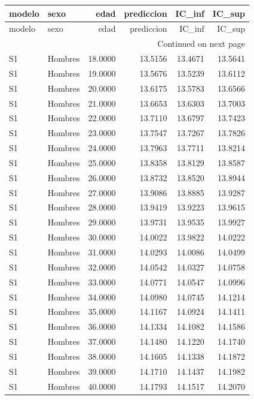 \begin{longtable}{llrrrr}
\toprule
modelo & sexo & edad & prediccion & IC\_inf & IC\_sup \\
\midrule
\endfirsthead
\toprule
modelo & sexo & edad & prediccion & IC\_inf & IC\_sup \\
\midrule
\endhead
\midrule
\multicolumn{6}{r}{Continued on next page} \\
\midrule
\endfoot
\bottomrule
\endlastfoot
S1 & Hombres & 18.0000 & 13.5156 & 13.4671 & 13.5641 \\
S1 & Hombres & 19.0000 & 13.5676 & 13.5239 & 13.6112 \\
S1 & Hombres & 20.0000 & 13.6175 & 13.5783 & 13.6566 \\
S1 & Hombres & 21.0000 & 13.6653 & 13.6303 & 13.7003 \\
S1 & Hombres & 22.0000 & 13.7110 & 13.6797 & 13.7423 \\
S1 & Hombres & 23.0000 & 13.7547 & 13.7267 & 13.7826 \\
S1 & Hombres & 24.0000 & 13.7963 & 13.7711 & 13.8214 \\
S1 & Hombres & 25.0000 & 13.8358 & 13.8129 & 13.8587 \\
S1 & Hombres & 26.0000 & 13.8732 & 13.8520 & 13.8944 \\
S1 & Hombres & 27.0000 & 13.9086 & 13.8885 & 13.9287 \\
S1 & Hombres & 28.0000 & 13.9419 & 13.9223 & 13.9615 \\
S1 & Hombres & 29.0000 & 13.9731 & 13.9535 & 13.9927 \\
S1 & Hombres & 30.0000 & 14.0022 & 13.9822 & 14.0222 \\
S1 & Hombres & 31.0000 & 14.0293 & 14.0086 & 14.0499 \\
S1 & Hombres & 32.0000 & 14.0542 & 14.0327 & 14.0758 \\
S1 & Hombres & 33.0000 & 14.0771 & 14.0547 & 14.0996 \\
S1 & Hombres & 34.0000 & 14.0980 & 14.0745 & 14.1214 \\
S1 & Hombres & 35.0000 & 14.1167 & 14.0924 & 14.1411 \\
S1 & Hombres & 36.0000 & 14.1334 & 14.1082 & 14.1586 \\
S1 & Hombres & 37.0000 & 14.1480 & 14.1220 & 14.1740 \\
S1 & Hombres & 38.0000 & 14.1605 & 14.1338 & 14.1872 \\
S1 & Hombres & 39.0000 & 14.1710 & 14.1437 & 14.1982 \\
S1 & Hombres & 40.0000 & 14.1793 & 14.1517 & 14.2070 \\

\end{longtable}
